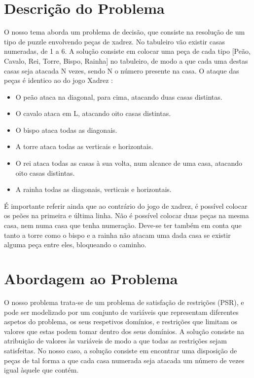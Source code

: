 \documentclass[runningheads]{llncs}
\begin{document}
\section{Descrição do Problema}
O nosso tema aborda um problema de decisão, que consiste na resolução de um tipo de puzzle envolvendo peças de xadrez. 
No tabuleiro vão existir casas numeradas, de 1 a 6.
 A solução consiste em colocar uma peça de cada tipo [Peão, Cavalo, Rei, Torre, Bispo, Rainha] no tabuleiro, de modo a que cada uma destas casas seja
atacada N vezes, sendo N o número presente na casa. O ataque das peças é identico ao do jogo Xadrez \cite{chessmove}:
\begin{itemize}
    \item  O peão ataca na diagonal, para cima, atacando duas casas distintas.
    \item  O cavalo ataca em L, atacando oito casas distintas. 
    \item  O bispo ataca todas as diagonais.
    \item  A torre ataca todas as verticais e horizontais.
    \item  O rei ataca todas as casas à sua volta, num alcance de uma casa, atacando oito casas distintas.
    \item  A rainha todas as diagonais, verticais e horizontais.
\end{itemize}

É importante referir ainda que ao contrário do jogo de xadrez, é possível colocar os peões 
na primeira e última linha. Não é possível colocar duas peças na mesma casa, nem numa casa que tenha numeração.
Deve-se ter também em conta que tanto a torre como o bispo e a rainha não atacam uma dada casa se existir alguma peça entre eles, bloqueando o caminho.

\newpage
\section{Abordagem ao Problema}
O nosso problema trata-se de um problema de satisfação de restrições (PSR), e pode ser modelizado por um conjunto de variáveis que representam diferentes aspetos do problema, os seus respetivos domínios, e restrições que limitam os valores que estas podem tomar dentro dos seus domínios.
A solução consiste na atribuição de valores às variáveis de modo a que todas as restrições sejam satisfeitas. No nosso caso, a solução consiste em encontrar uma disposição de peças de tal forma a que cada casa numerada seja atacada um número de vezes igual àquele que contém.
\end{document}
